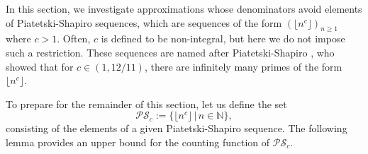 \documentclass[reqno]{amsart}
\theoremstyle{definition}
\begin{document}
In this section, we investigate approximations whose denominators avoid elements of Piatetski-Shapiro sequences, which are sequences of the form $(\lfloor{n^{c}}\rfloor)_{n\geq 1}$ where $c > 1$.  Often, $c$ is defined to be non-integral, but here we do not impose such a restriction.  These sequences are named after Piatetski-Shapiro \cite{piatetski-shapiro1953}, who showed that for $c \in (1,12/11)$, there are infinitely many primes of the form $\lfloor{n^{c}}\rfloor$.

To prepare for the remainder of this section, let us define the set 
\begin{equation*}
    \mathcal{PS}_{c} := \{\lfloor{n^{c}}\rfloor\,\vert\, n \in \mathbb{N}\},
\end{equation*}
consisting of the elements of a given Piatetski-Shapiro sequence.  The following lemma provides an upper bound for the counting function of $\mathcal{PS}_{c}$.
\end{document}
